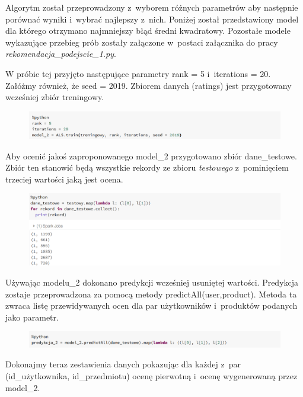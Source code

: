 \documentclass[12pt,a4paper]{report}
\begin{document}
Algorytm został przeprowadzony z~wyborem różnych parametrów aby następnie porównać wyniki i~wybrać najlepszy z~nich.
Poniżej został przedstawiony model dla którego otrzymano najmniejszy błąd średni kwadratowy.
Pozostałe modele wykazujące przebieg prób zostały załączone w~postaci załącznika do pracy \textit{rekomendacja\_podejscie\_1.py}. 

W próbie tej przyjęto następujące parametry rank = 5 i~iterations = 20. Załóżmy również, że seed = 2019. Zbiorem danych (ratings) jest przygotowany wcześniej zbiór treningowy.

\begin{figure}[H]
\includegraphics[scale=0.5]{obrazy/ALS8.PNG} 
\end{figure}

Aby ocenić jakoś zaproponowanego model\_2 przygotowano zbiór dane\_testowe. Zbiór ten stanowić będą wszystkie rekordy ze zbioru \textit{testowego} z~pominięciem trzeciej wartości jaką jest ocena.

\begin{figure}[H]
\includegraphics[scale=0.5]{obrazy/ALS9.PNG} 
\end{figure}

Używając modelu\_2 dokonano predykcji wcześniej usuniętej wartości.
Predykcja zostaje przeprowadzona za pomocą metody  predictAll(user,product). Metoda ta zwraca listę przewidywanych ocen dla par użytkowników i~produktów podanych jako parametr.

\begin{figure}[H]
\includegraphics[scale=0.5]{obrazy/ALS10.PNG} 
\end{figure}

Dokonajmy teraz zestawienia danych pokazując dla każdej z~par (id\_użytkownika, id\_przedmiotu) ocenę pierwotną i~ocenę wygenerowaną przez model\_2.
\end{document}
